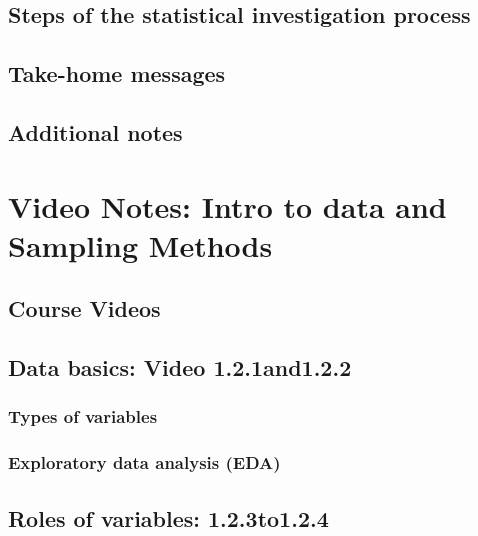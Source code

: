 \documentclass[
]{report}
\begin{document}
\subsection{Steps of the statistical investigation process}\label{steps-of-the-statistical-investigation-process}

\subsection{Take-home messages}\label{take-home-messages}

\subsection{Additional notes}\label{additional-notes}

\section{Video Notes: Intro to data and Sampling Methods}\label{video-notes-intro-to-data-and-sampling-methods}

\subsection{Course Videos}\label{course-videos}

\subsection*{Data basics: Video 1.2.1and1.2.2}\label{data-basics-video-1.2.1and1.2.2}

\subsubsection*{Types of variables}\label{types-of-variables}

\subsubsection*{Exploratory data analysis (EDA)}\label{exploratory-data-analysis-eda}

\subsection*{Roles of variables: 1.2.3to1.2.4}\label{roles-of-variables-1.2.3to1.2.4}
\end{document}

